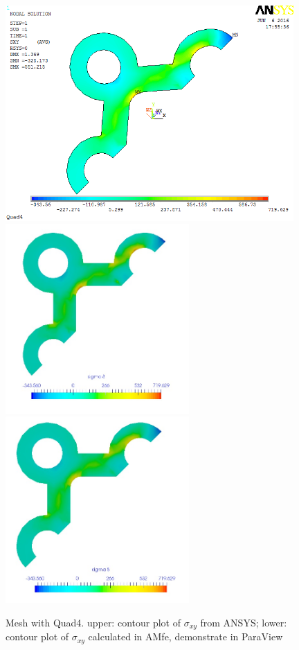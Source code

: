 \begin{figure}[htbp]
	\begin{center}
		\includegraphics[width=11cm,clip]{Quad4_Sxy.png} 	
		\includegraphics[width=7cm,clip]{Quad4_Sxy_PD.png} 	
		\includegraphics[width=7cm,clip]{Quad4_Sxy_P.png} 		
		\caption{Mesh with Quad4. upper: contour plot of $\sigma_{xy}$ from ANSYS; lower: contour plot of $\sigma_{xy}$ calculated in AMfe, demonstrate in ParaView} \label{fig: Quad4_Sxy}
	\end{center}
\end{figure}
\clearpage 

